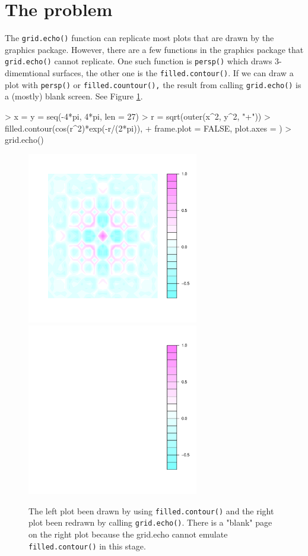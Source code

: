 \documentclass{report}
\begin{document}
\section{The problem}
The \texttt{grid.echo()} function can replicate most plots that are drawn by the graphics package. However, there are a few functions in the graphics package that \texttt{grid.echo()} cannot replicate. One such function is \texttt{persp()} which draws 3-dimemtional surfaces, the other one is the \texttt{filled.contour()}. If we can draw a plot with \texttt{persp()} or \texttt{filled.countour(),} the result from calling \texttt{grid.echo()} is a (mostly) blank screen. See Figure \ref{figure_1.3}.
\begin{Schunk}
\begin{Sinput}
> x = y = seq(-4*pi, 4*pi, len = 27)
> r = sqrt(outer(x^2, y^2, "+"))
> filled.contour(cos(r^2)*exp(-r/(2*pi)), 
+                frame.plot = FALSE, plot.axes = {})
> grid.echo()
\end{Sinput}
\end{Schunk}
\begin{figure}[h]
	\begin{center}
		\includegraphics[height = 7.5cm, width = 7.5cm]{figure/report_fill_1}
		\includegraphics[height = 7.5cm, width = 7.5cm]{figure/report_fill_2}
		\caption{The left plot been drawn by using \texttt{filled.contour()} and the right plot been redrawn by calling \texttt{grid.echo()}. There is a "blank" page on the right plot because the grid.echo cannot emulate \texttt{filled.contour()} in this stage.}
		\label{figure_1.3}
	\end{center}
\end{figure}
\end{document}
